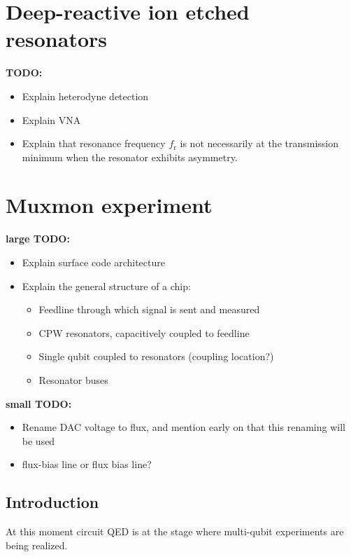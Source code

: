 \documentclass[12pt]{report}
\newcommand{\fres}{f_\text{r}}
\begin{document}
\part{Deep-reactive ion etched resonators}

\textbf{TODO:}
\begin{itemize}
  \item Explain heterodyne detection
  \item Explain VNA
  \item Explain that resonance frequency $\fres$ is not necessarily at the transmission minimum when the resonator exhibits asymmetry.
\end{itemize}





\part{Muxmon experiment}

  \textbf{large TODO:}
  \begin{itemize}
    \item Explain surface code architecture
    \item Explain the general structure of a chip:
    \begin{itemize}
      \item Feedline through which signal is sent and measured
      \item CPW resonators, capacitively coupled to feedline
      \item Single qubit coupled to resonators (coupling location?)
      \item Resonator buses
    \end{itemize}
  \end{itemize}

  \textbf{small TODO:}
  \begin{itemize}
    \item Rename DAC voltage to flux, and mention early on that this renaming will be used
    \item flux-bias line or flux bias line?
  \end{itemize}



  \chapter*{Introduction}

    At this moment circuit QED is at the stage where multi-qubit experiments are being realized.
\end{document}
